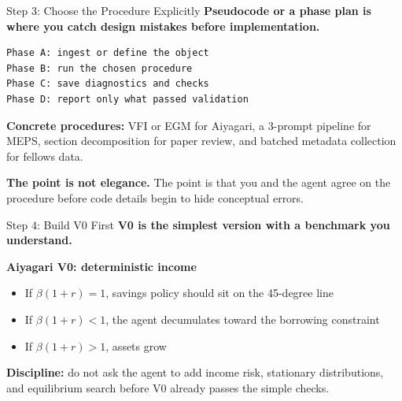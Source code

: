 \documentclass[10pt,english,aspectratio=169]{beamer}
\begin{document}
\begin{frame}[fragile]{Step 3: Choose the Procedure Explicitly}
\textbf{Pseudocode or a phase plan is where you catch design mistakes before implementation.}

\vspace{0.2cm}

\begin{lstlisting}[style=pythonstyle,language={},basicstyle=\ttfamily\tiny,numbers=none]
Phase A: ingest or define the object
Phase B: run the chosen procedure
Phase C: save diagnostics and checks
Phase D: report only what passed validation
\end{lstlisting}

\vspace{0.15cm}

\textbf{Concrete procedures:} VFI or EGM for Aiyagari, a 3-prompt pipeline for MEPS, section decomposition for paper review, and batched metadata collection for fellows data.

\vspace{0.15cm}
\textbf{The point is not elegance.} The point is that you and the agent agree on the procedure before code details begin to hide conceptual errors.
\end{frame}

\begin{frame}{Step 4: Build V0 First}
\textbf{V0 is the simplest version with a benchmark you understand.}

\vspace{0.25cm}

\textbf{Aiyagari V0: deterministic income}
\begin{itemize}
    \item If $\beta(1+r)=1$, savings policy should sit on the 45-degree line
    \item If $\beta(1+r)<1$, the agent decumulates toward the borrowing constraint
    \item If $\beta(1+r)>1$, assets grow
\end{itemize}

\vspace{0.25cm}

\textbf{Discipline:} do not ask the agent to add income risk, stationary distributions, and equilibrium search before V0 already passes the simple checks.
\end{frame}
\end{document}
